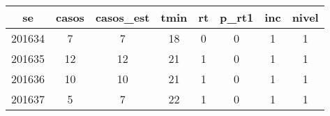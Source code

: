 \begin{tabular}{c|ccccccc}
  \hline
se & casos & casos\_est & tmin & rt & p\_rt1 & inc & nivel \\ 
  \hline
201634 & 7 & 7 & 18 & 0 & 0 & 1 & 1 \\ 
  201635 & 12 & 12 & 21 & 1 & 0 & 1 & 1 \\ 
  201636 & 10 & 10 & 21 & 1 & 0 & 1 & 1 \\ 
  201637 & 5 & 7 & 22 & 1 & 0 & 1 & 1 \\ 
   \hline
\end{tabular}
